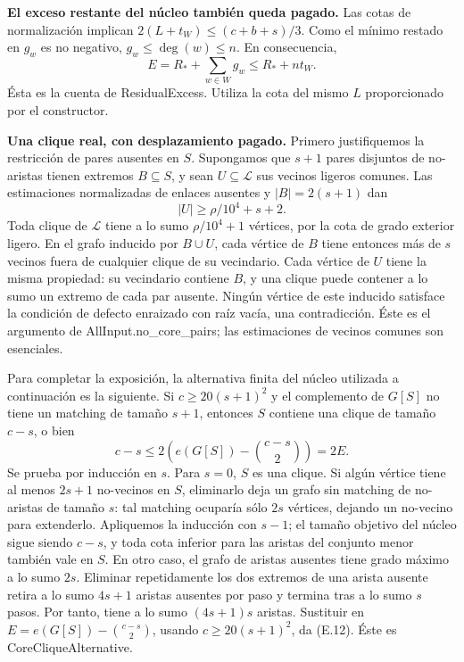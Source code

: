 \documentclass[spanish,11pt,a4paper]{article}
\begin{document}
\textbf{El exceso restante del núcleo también queda pagado.} Las cotas de normalización implican \(2(L+t_W)\le(c+b+s)/3\). Como el mínimo restado en \(g_w\) es no negativo, \(g_w\le\deg(w)\le n\). En consecuencia, \[
E=R_*+\sum_{w\in W}g_w\le R_*+nt_W.
\tag{E.11}
\] Ésta es la cuenta de ResidualExcess. Utiliza la cota del mismo \(L\) proporcionado por el constructor.

\textbf{Una clique real, con desplazamiento pagado.} Primero justifiquemos la restricción de pares ausentes en \(S\). Supongamos que \(s+1\) pares disjuntos de no-aristas tienen extremos \(B\subseteq S\), y sean \(U\subseteq\mathcal L\) sus vecinos ligeros comunes. Las estimaciones normalizadas de enlaces ausentes y \(|B|=2(s+1)\) dan \[
|U|\ge\rho/10^4+s+2.
\] Toda clique de \(\mathcal L\) tiene a lo sumo \(\rho/10^4+1\) vértices, por la cota de grado exterior ligero. En el grafo inducido por \(B\cup U\), cada vértice de \(B\) tiene entonces más de \(s\) vecinos fuera de cualquier clique de su vecindario. Cada vértice de \(U\) tiene la misma propiedad: su vecindario contiene \(B\), y una clique puede contener a lo sumo un extremo de cada par ausente. Ningún vértice de este inducido satisface la condición de defecto enraizado con raíz vacía, una contradicción. Éste es el argumento de {\ttfamily\small AllInput.\discretionary{\hbox{\ensuremath{\hookrightarrow}}}{}{}no\_\discretionary{\hbox{\ensuremath{\hookrightarrow}}}{}{}core\_\discretionary{\hbox{\ensuremath{\hookrightarrow}}}{}{}pairs}; las estimaciones de vecinos comunes son esenciales.

Para completar la exposición, la alternativa finita del núcleo utilizada a continuación es la siguiente. Si \(c\ge20(s+1)^2\) y el complemento de \(G[S]\) no tiene un matching de tamaño \(s+1\), entonces \(S\) contiene una clique de tamaño \(c-s\), o bien \[
c-s\le2\left(e(G[S])-\binom{c-s}{2}\right)=2E.
\tag{E.12}
\] Se prueba por inducción en \(s\). Para \(s=0\), \(S\) es una clique. Si algún vértice tiene al menos \(2s+1\) no-vecinos en \(S\), eliminarlo deja un grafo sin matching de no-aristas de tamaño \(s\): tal matching ocuparía sólo \(2s\) vértices, dejando un no-vecino para extenderlo. Apliquemos la inducción con \(s-1\); el tamaño objetivo del núcleo sigue siendo \(c-s\), y toda cota inferior para las aristas del conjunto menor también vale en \(S\). En otro caso, el grafo de aristas ausentes tiene grado máximo a lo sumo \(2s\). Eliminar repetidamente los dos extremos de una arista ausente retira a lo sumo \(4s+1\) aristas ausentes por paso y termina tras a lo sumo \(s\) pasos. Por tanto, tiene a lo sumo \((4s+1)s\) aristas. Sustituir en \(E=e(G[S])-\binom{c-s}{2}\), usando \(c\ge20(s+1)^2\), da (E.12). Éste es CoreCliqueAlternative.
\end{document}
